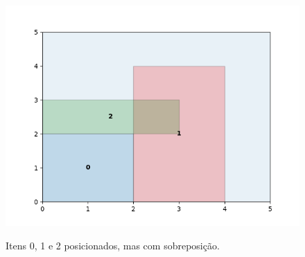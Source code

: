 \begin{figure}[H]
    \centering
    \caption{Itens 0, 1 e 2 posicionados, mas com sobreposição.}
    \includegraphics[scale=0.5]{utils/images/continuous_example2}
    \label{fig:sobreposicao-dominio2}
\end{figure}
